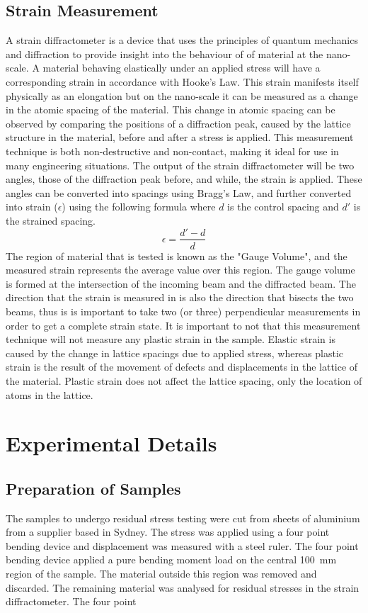 \documentclass[11pt, oneside]{article}   	%
\begin{document}
\subsection{Strain Measurement}
A strain diffractometer is a device that uses the principles of quantum mechanics and diffraction to provide insight into the behaviour of of material at the nano-scale. A material behaving elastically under an applied stress will have a corresponding strain in accordance with Hooke's Law. This strain manifests itself physically as an elongation but on the nano-scale it can be measured as a change in the atomic spacing of the material. This change in atomic spacing can be observed by comparing the positions of a diffraction peak, caused by the lattice structure in the material, before and after a stress is applied. This measurement technique is both non-destructive and non-contact, making it ideal for use in many engineering situations.
The output of the strain diffractometer will be two angles, those of the diffraction peak before, and while, the strain is applied. These angles can be converted into spacings using Bragg's Law, and further converted into strain ($\epsilon$) using the following formula where $d$ is the control spacing and $d'$ is the strained spacing.
\[
\epsilon = \frac{d'-d}{d}
\]
The region of material that is tested is known as the "Gauge Volume", and the measured strain represents the average value over this region. The gauge volume is formed at the intersection of the incoming beam and the diffracted beam. The direction that the strain is measured in is also the direction that bisects the two beams, thus is is important to take two (or three) perpendicular measurements in order to get a complete strain state.
It is important to not that this measurement technique will not measure any plastic strain in the sample. Elastic strain is caused by the change in lattice spacings due to applied stress, whereas plastic strain is the result of the movement of defects and displacements in the lattice of the material. Plastic strain does not affect the lattice spacing, only the location of atoms in the lattice.
\section{Experimental Details}
\subsection{Preparation of Samples}
The samples to undergo residual stress testing were cut from sheets of aluminium from a supplier based in Sydney. The stress was applied using a four point bending device and displacement was measured with a steel ruler. The four point bending device applied a pure bending moment load on the central \SI{100}{\milli\meter} region of the sample. The material outside this region was removed and discarded. The remaining material was analysed for residual stresses in the strain diffractometer. The four point 
\end{document}

